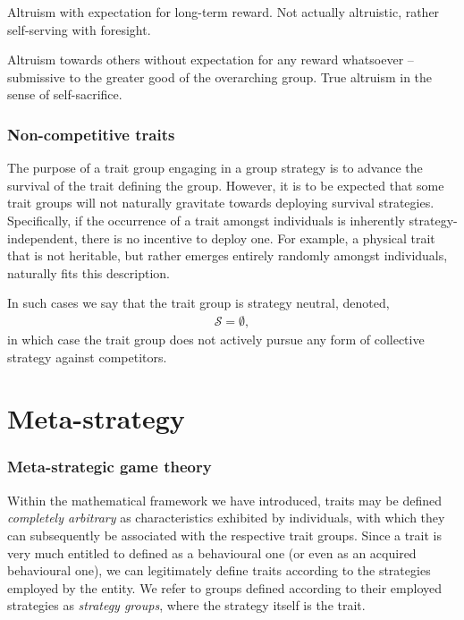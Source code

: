 \documentclass[twocolumn, aps, rmp, amsmath, amssymb, nofootinbib, superscriptaddress, longbibliography, floatfix, table-of-contents, eqsecnum]{revtex4-1}
\begin{document}
Altruism with expectation for long-term reward. Not actually altruistic, rather self-serving with foresight.

Altruism towards others without expectation for any reward whatsoever -- submissive to the greater good of the overarching group. True altruism in the sense of self-sacrifice.

\section{Non-competitive traits}

The purpose of a trait group engaging in a group strategy is to advance the survival of the trait defining the group. However, it is to be expected that some trait groups will not naturally gravitate towards deploying survival strategies. Specifically, if the occurrence of a trait amongst individuals is inherently strategy-independent, there is no incentive to deploy one. For example, a physical trait that is not heritable, but rather emerges entirely randomly amongst individuals, naturally fits this description.

In such cases we say that the trait group is strategy neutral, denoted,
\begin{align}
	\mathcal{S}=\emptyset,
\end{align}
in which case the trait group does not actively pursue any form of collective strategy against competitors.

%
%

\part{Meta-strategy}

\section{Meta-strategic game theory}

Within the mathematical framework we have introduced, traits may be defined \textit{completely arbitrary} as characteristics exhibited by individuals, with which they can subsequently be associated with the respective trait groups. Since a trait is very much entitled to defined as a behavioural one (or even as an acquired behavioural one), we can legitimately define traits according to the strategies employed by the entity. We refer to groups defined according to their employed strategies as \textit{strategy groups}, where the strategy itself is the trait.
\end{document}
